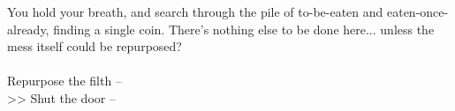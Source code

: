 You hold your breath, and search through the pile of to-be-eaten and eaten-once-already, finding a single coin. There’s nothing else to be done here... unless the mess itself could be repurposed?\\
\\

 Repurpose the filth -- \\
>> Shut the door -- 